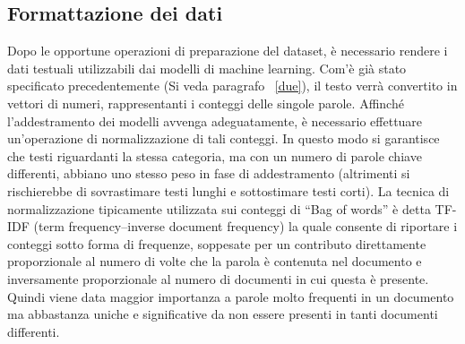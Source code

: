 \documentclass[12pt,oneside]{article}
\begin{document}
    \begin{enumerate}
    \subsection{Formattazione dei dati}
    \begin{justify}
    Dopo le opportune operazioni di preparazione del dataset, è necessario rendere i dati testuali utilizzabili dai modelli di machine learning. Com’è già stato specificato precedentemente (Si veda paragrafo ~\ref{due}), il testo verrà convertito in vettori di numeri, rappresentanti i conteggi delle singole parole. 
    Affinché l’addestramento dei modelli avvenga adeguatamente, è necessario effettuare un’operazione di normalizzazione di tali conteggi. In questo modo si garantisce che testi riguardanti la stessa categoria, ma con un numero di parole chiave differenti, abbiano uno stesso peso in fase di addestramento (altrimenti si rischierebbe di sovrastimare testi lunghi e sottostimare testi corti). 
    La tecnica di normalizzazione tipicamente utilizzata sui conteggi di “Bag of words” è detta TF-IDF (term frequency–inverse document frequency) la quale consente di riportare i conteggi sotto forma di frequenze, soppesate per un contributo direttamente proporzionale al numero di volte che la parola è contenuta nel documento e inversamente proporzionale al numero di documenti in cui questa è presente. Quindi viene data maggior importanza a parole molto frequenti in un documento ma abbastanza uniche e significative da non essere presenti in tanti documenti differenti.

    \end{justify}
    \end{enumerate}
\end{document}
